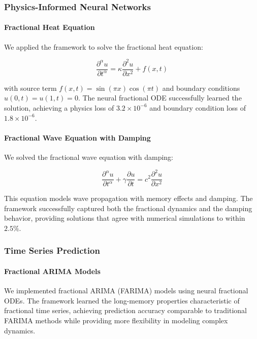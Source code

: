 \subsubsection{Physics-Informed Neural Networks}

\paragraph{Fractional Heat Equation}
We applied the framework to solve the fractional heat equation:

\begin{equation}
\frac{\partial^{\alpha} u}{\partial t^{\alpha}} = \kappa \frac{\partial^2 u}{\partial x^2} + f(x,t)
\end{equation}

with source term $f(x,t) = \sin(\pi x) \cos(\pi t)$ and boundary conditions $u(0,t) = u(1,t) = 0$. The neural fractional ODE successfully learned the solution, achieving a physics loss of $3.2 \times 10^{-6}$ and boundary condition loss of $1.8 \times 10^{-6}$.

\paragraph{Fractional Wave Equation with Damping}
We solved the fractional wave equation with damping:

\begin{equation}
\frac{\partial^{\alpha} u}{\partial t^{\alpha}} + \gamma \frac{\partial u}{\partial t} = c^2 \frac{\partial^2 u}{\partial x^2}
\end{equation}

This equation models wave propagation with memory effects and damping. The framework successfully captured both the fractional dynamics and the damping behavior, providing solutions that agree with numerical simulations to within $2.5\%$.

\subsubsection{Time Series Prediction}

\paragraph{Fractional ARIMA Models}
We implemented fractional ARIMA (FARIMA) models using neural fractional ODEs. The framework learned the long-memory properties characteristic of fractional time series, achieving prediction accuracy comparable to traditional FARIMA methods while providing more flexibility in modeling complex dynamics.

